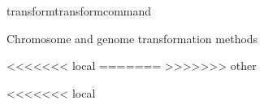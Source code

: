 \begin{command}{transform}{transformcommand}
\begin{arguments}
\begin{argumentgroup}{Chromosome and genome transformation methods}
{\begin{statement}
\begin{description}
\begin{description}
<<<<<<< local
=======
>>>>>>> other

<<<<<<< local
                           

\end{description}
\end{description}
\end{statement}}
\end{argumentgroup}
\end{arguments}
\end{command}
